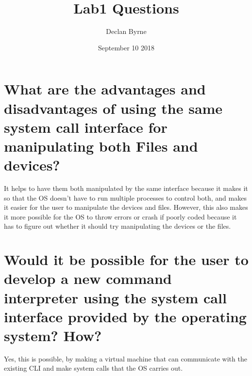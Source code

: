 \documentclass{article}
\title{Lab1 Questions}
\author{Declan Byrne}
\date{September 10 2018}
\begin{document}
\maketitle

\section{What are the advantages and disadvantages of using the same system call interface for manipulating both Files and devices?}
It helps to have them both manipulated by the same interface because it makes it so that the OS doesn't have to run multiple processes to control both, and makes it easier for the user to manipulate the devices and files.
However, this also makes it more possible for the OS to throw errors or crash if poorly coded because it has to figure out whether it should try manipulating the devices or the files.
\section{Would it be possible for the user to develop a new command interpreter using the system call interface provided by the operating system? How?}
Yes, this is possible, by making a virtual machine that can communicate with the existing CLI and make system calls that the OS carries out.
\end{document}
